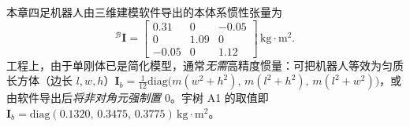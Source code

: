 \begin{example}[本体系惯性张量数值例与对角化工程取值]\label{exam:inertia}
本章四足机器人由三维建模软件导出的本体系惯性张量为\cite{dicarlo2018cheetah}
\begin{equation}
  {}^{\mathcal{B}}\mathbf{I}=\begin{bmatrix} 0.31 & 0 & -0.05 \\ 0 & 1.09 & 0 \\ -0.05 & 0 & 1.12 \end{bmatrix}\,\mathrm{kg\cdot m^2}.
  \label{eq:inertia-num}
\end{equation}
工程上，由于单刚体已是简化模型，通常\emph{无需}高精度惯量：可把机器人等效为匀质长方体（边长 $l,w,h$）$\mathbf{I}_b=\tfrac{1}{12}\mathrm{diag}\!\big(m(w^2+h^2),\,m(l^2+h^2),\,m(l^2+w^2)\big)$，或由软件导出后\emph{将非对角元强制置 $0$}。宇树 A1 的取值即 $\mathbf{I}_b=\mathrm{diag}(0.1320,\,0.3475,\,0.3775)\,\mathrm{kg\cdot m^2}$\cite{unitree2023quadruped}。
\end{example}

